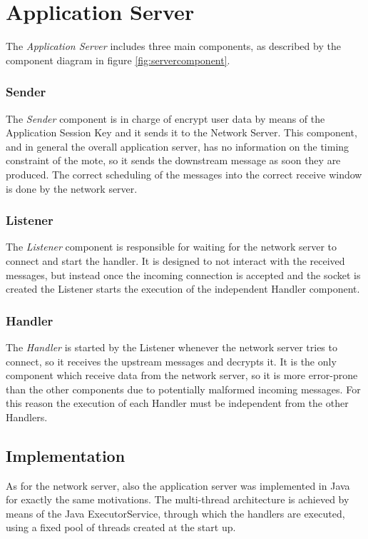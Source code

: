 \newpage
\section{Application Server}
The \emph{Application Server} includes three main components, as described by the component diagram in figure \ref{fig:servercomponent}.

\subsubsection{Sender}
The \emph{Sender} component is in charge of encrypt user data by means of the Application Session Key and it sends it to the Network Server. This component, and in general the overall application server, has no information on the timing constraint of the mote, so it sends the downstream message as soon they are produced. The correct scheduling of the messages into the correct receive window is done by the network server.

\subsubsection{Listener}
The \emph{Listener} component is responsible for waiting for the network server to connect and start the handler. It is designed to not interact with the received messages, but instead once the incoming connection is accepted and the socket is created the Listener starts the execution of the independent Handler component.

\subsubsection{Handler}
The \emph{Handler} is started by the Listener whenever the network server tries to connect, so it receives the upstream messages and decrypts it. It is the only component which receive data from the network server, so it is more error-prone than the other components due to potentially malformed incoming messages. For this reason the execution of each Handler must be independent from the other Handlers.

\subsection{Implementation}
As for the network server, also the application server was implemented in Java for exactly the same motivations. The multi-thread architecture is achieved by means of the Java ExecutorService, through which the handlers are executed, using a fixed pool of threads created at the start up.

